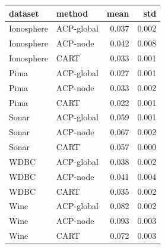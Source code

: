 \begin{tabular}{llrr}
\toprule
dataset & method & mean & std \\
\midrule
Ionosphere & ACP-global & 0.037 & 0.002 \\
Ionosphere & ACP-node & 0.042 & 0.008 \\
Ionosphere & CART & 0.033 & 0.001 \\
Pima & ACP-global & 0.027 & 0.001 \\
Pima & ACP-node & 0.033 & 0.002 \\
Pima & CART & 0.022 & 0.001 \\
Sonar & ACP-global & 0.059 & 0.001 \\
Sonar & ACP-node & 0.067 & 0.002 \\
Sonar & CART & 0.057 & 0.000 \\
WDBC & ACP-global & 0.038 & 0.002 \\
WDBC & ACP-node & 0.041 & 0.004 \\
WDBC & CART & 0.035 & 0.002 \\
Wine & ACP-global & 0.082 & 0.002 \\
Wine & ACP-node & 0.093 & 0.003 \\
Wine & CART & 0.072 & 0.003 \\
\bottomrule
\end{tabular}
